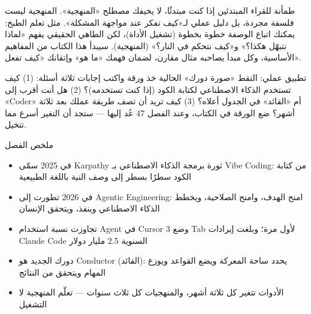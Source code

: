 \begin{tcbinfo}{طمأنة للقراء المبتدئين}
إذا كنت مبتدئًا، لا يخيفك مصطلح «المنهجية». المنهجية ليست فلسفة مجردة، بل دليل عملي لـ«كيف تفكر عند مواجهة المشكلة». مثل تعلم الطبخ: يمكنك اتباع الوصفة خطوة بخطوة (تشغيل الأداة)، لكن الطاهي الحقيقي يفهم «لماذا نتبهّل هكذا؟» و«كيف نتحكم في النار؟» (المنهجية). سيبدأ هذا الكتاب من المفاهيم الأساسية، وكل مبدأ يصاحبه مثال مقارن، لضمان فهمك «ما هو» وإتقانك «كيف تفعل».

\end{tcbinfo}

\begin{tcbpractice}{تطبيق عملي: التقط «صورة دورك» الحالية}
خذ ورقة واكتب إجابات ثلاثة أسئلة: (1) كيف تستخدم الذكاء الاصطناعي لكتابة الكود (إذا كنت تستخدمه)؟ (2) هل أنت أقرب إلى «Coder» أم «القائد» في الجدول أعلاه؟ (3) كيف تريد أن تصف طريقة عملك بعد ثلاثة أشهر؟ ضع الورقة في الكتاب، وعند الفصل 47 عُد إليها — ستجد أن التغير أسرع مما تتخيل.

\end{tcbpractice}

\begin{tcbsummary}{ملخص الفصل}
\begin{itemize}
  \item في 2025 سمّى Karpathy ثورة برمجة الذكاء الاصطناعي بـ Vibe Coding: من كتابة الكود سطرًا بسطر إلى وصف النية باللغة الطبيعية
  \item في 2026 تطورت إلى Agentic Engineering: امنح الهدف، وامنح الصلاحية، ويخطط الذكاء الاصطناعي وينفذ، ويتحقق الإنسان
  \item تجاوزت نسبة استخدام Agent في Cursor 3 وضع Tab لأول مرة؛ وبلغت إيرادات Claude Code السنوية 2.5 مليار دولار
  \item دورك الجديد هو Conductor (القائد): يحدد ساحة المعركة ويضع القواعد ويوزع المهام ويتحقق من النتائج
  \item الأدوات تتغير كل ثلاثة أشهر، والمنهجيات كل ثلاث سنوات — تعلّم المنهجية لا التشغيل
\end{itemize}

\end{tcbsummary}
